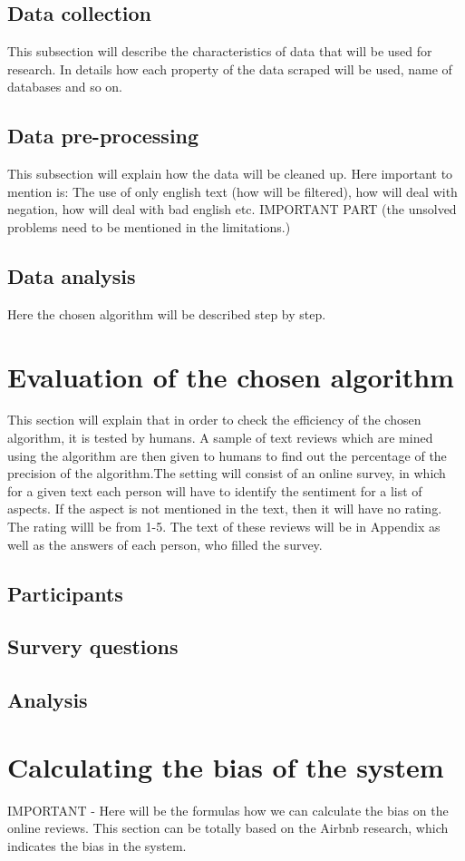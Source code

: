 \subsection{Data collection}
This subsection will describe the characteristics of data that will be used for research. In details how each property of the data scraped will be used, name of databases and so on.
\subsection{Data pre-processing}
This subsection will explain how the data will be cleaned up. Here important to mention is: The use of only english text (how will be filtered), how will deal with negation, how will deal with bad english etc. IMPORTANT PART (the unsolved problems need to be mentioned in the limitations.)
\subsection{Data analysis}
Here the chosen algorithm will be described step by step. 

\section{Evaluation of the chosen algorithm}
This section will explain that in order to check the efficiency of the chosen algorithm, it is tested by humans. A sample of text reviews which are mined using the algorithm are then given to humans to find out the percentage of the precision of the algorithm.The setting will consist of an online survey, in which for a given text each person will have to identify the sentiment for a list of aspects. If the aspect is not mentioned in the text, then it will have no rating. The rating willl be from 1-5. The text of these reviews will be in Appendix as well as the answers of each person, who filled the survey.
\subsection{Participants}
\subsection{Survery questions}
\subsection{Analysis}
\section{Calculating the bias of the system}
IMPORTANT - Here will be the formulas how we can calculate the bias on the online reviews. This section can be totally based on the Airbnb research, which indicates the bias in the system.